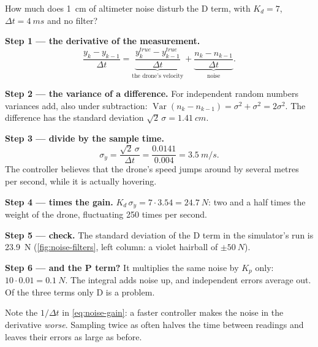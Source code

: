 \begin{example}
\label{ex:noise-raw}
How much does \SI{1}{cm} of altimeter noise disturb the D term, with $K_d = 7$, $\Delta t = \SI{4}{ms}$ and no filter?

\textbf{Step 1 — the derivative of the measurement.}
\begin{equation*}
  \frac{y_k - y_{k-1}}{\Delta t} = \underbrace{\frac{y^{true}_k - y^{true}_{k-1}}{\Delta t}}_{\text{the drone's velocity}} + \underbrace{\frac{n_k - n_{k-1}}{\Delta t}}_{\text{noise}} .
\end{equation*}

\textbf{Step 2 — the variance of a difference.} For independent random numbers variances add, also under subtraction: $\operatorname{Var}(n_k - n_{k-1}) = \sigma^2 + \sigma^2 = 2\sigma^2$. The difference has the standard deviation $\sqrt2\,\sigma = \SI{1.41}{cm}$.

\textbf{Step 3 — divide by the sample time.}
\begin{equation}\label{eq:noise-gain}
  \sigma_{\dot y} = \frac{\sqrt2\,\sigma}{\Delta t} = \frac{0.0141}{0.004} = \SI{3.5}{m/s}.
\end{equation}
The controller believes that the drone's speed jumps around by several metres per second, while it is actually hovering.

\textbf{Step 4 — times the gain.} $K_d\,\sigma_{\dot y} = 7 \cdot 3.54 = \SI{24.7}{N}$: two and a half times the weight of the drone, fluctuating 250 times per second.

\textbf{Step 5 — check.} The standard deviation of the D term in the simulator's run is \SI{23.9}{N} (\cref{fig:noise-filters}, left column: a violet hairball of $\pm\SI{50}{N}$).

\textbf{Step 6 — and the P term?} It multiplies the same noise by $K_p$ only: $10 \cdot 0.01 = \SI{0.1}{N}$. The integral adds noise up, and independent errors average out. Of the three terms only D is a problem.
\end{example}

Note the $1/\Delta t$ in \cref{eq:noise-gain}: a faster controller makes the noise in the derivative \emph{worse}. Sampling twice as often halves the time between readings and leaves their errors as large as before.

